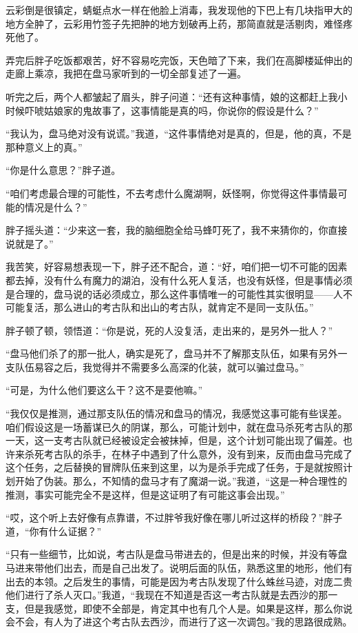 云彩倒是很镇定，蜻蜓点水一样在他脸上消毒，我发现他的下巴上有几块指甲大的地方全肿了，云彩用竹签子先把肿的地方划破再上药，那简直就是活剔肉，难怪疼死他了。

弄完后胖子吃饭都艰苦，好不容易吃完饭，天色暗了下来，我们在高脚楼延伸出的走廊上乘凉，我把在盘马家听到的一切全部复述了一遍。

听完之后，两个人都皱起了眉头，胖子问道：“还有这种事情，娘的这都赶上我小时候吓唬姑娘家的鬼故事了，这事情能是真的吗，你说你的假设是什么？”

“我认为，盘马绝对没有说谎。”我道，“这件事情绝对是真的，但是，他的真，不是那种意义上的真。”

“你是什么意思？”胖子道。

“咱们考虑最合理的可能性，不去考虑什么魔湖啊，妖怪啊，你觉得这件事情最可能的情况是什么？”

胖子摇头道：“少来这一套，我的脑细胞全给马蜂叮死了，我不来猜你的，你直接说就是了。”

我苦笑，好容易想表现一下，胖子还不配合，道：“好，咱们把一切不可能的因素都去掉，没有什么有魔力的湖泊，没有什么死人复活，也没有妖怪，但是事情必须是合理的，盘马说的话必须成立，那么这件事情唯一的可能性其实很明显——人不可能复活，那么进山的考古队和出山的考古队，就肯定不是同一支队伍。”

胖子顿了顿，领悟道：“你是说，死的人没复活，走出来的，是另外一批人？”

“盘马他们杀了的那一批人，确实是死了，盘马并不了解那支队伍，如果有另外一支队伍易容之后，我觉得并不需要多么高深的化装，就可以骗过盘马。”

“可是，为什么他们要这么干？这不是耍他嘛。”

“我仅仅是推测，通过那支队伍的情况和盘马的情况，我感觉这事可能有些误差。咱们假设这是一场蓄谋已久的阴谋，那么，可能计划中，就在盘马杀死考古队的那一天，这一支考古队就已经被设定会被抹掉，但是，这个计划可能出现了偏差。也许来杀死考古队的杀手，在林子中遇到了什么意外，没有到来，反而由盘马完成了这个任务，之后替换的冒牌队伍来到这里，以为是杀手完成了任务，于是就按照计划开始了伪装。那么，不知情的盘马才有了魔湖一说。”我道，“这是一种合理性的推测，事实可能完全不是这样，但是这证明了有可能这事会出现。”

“哎，这个听上去好像有点靠谱，不过胖爷我好像在哪儿听过这样的桥段？”胖子道，“你有什么证据？”

“只有一些细节，比如说，考古队是盘马带进去的，但是出来的时候，并没有等盘马进来带他们出去，而是自己出发了。说明后面的队伍，熟悉这里的地形，他们有出去的本领。之后发生的事情，可能是因为考古队发现了什么蛛丝马迹，对庞二贵他们进行了杀人灭口。”我道，“我现在不知道是否这一考古队就是去西沙的那一支，但是我感觉，即使不全部是，肯定其中也有几个人是。如果是这样，那么你说会不会，有人为了进这个考古队去西沙，而进行了这一次调包。”我的思路很成熟。

